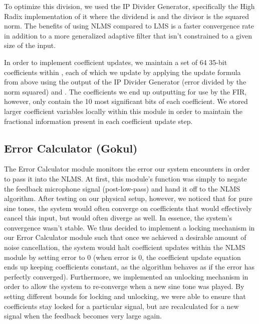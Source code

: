 \documentclass{fpgairpods}
\begin{document}
To optimize this division, we used the IP Divider Generator, specifically the High Radix implementation of it where the dividend is  and the divisor is the squared norm. The benefits of using NLMS compared to LMS is a faster convergence rate in addition to a more generalized adaptive filter that isn't constrained to a given size of the input. 

In order to implement coefficient updates, we maintain a set of 64 35-bit coefficients within , each of which we update by applying the update formula from above using the output of the IP Divider Generator  (error divided by the norm squared) and . The coefficients we end up outputting for use by the FIR, however, only contain the 10 most significant bits of each  coefficient. We stored larger coefficient variables locally within this module in order to maintain the fractional information present in each coefficient update step.

\subsection{Error Calculator (Gokul)}
The Error Calculator module monitors the error our system encounters in order to pass it into the NLMS. At first, this module's function was simply to negate the feedback microphone signal (post-low-pass) and hand it off to the NLMS algorithm. After testing on our physical setup, however, we noticed that for pure sine tones, the system would often converge on coefficients that would effectively cancel this input, but would often diverge as well. In essence, the system's convergence wasn't stable. We thus decided to implement a locking mechanism in our Error Calculator module such that once we achieved a desirable amount of noise cancellation, the system would halt coefficient updates within the NLMS module by setting error to 0 (when error is 0, the coefficient update equation ends up keeping coefficients constant, as the algorithm behaves as if the error has perfectly converged). Furthermore, we implemented an unlocking mechanism in order to allow the system to re-converge when a new sine tone was played. By setting different bounds for locking and unlocking, we were able to ensure that coefficients stay locked for a particular signal, but are recalculated for a new signal when the feedback becomes very large again.
\end{document}
